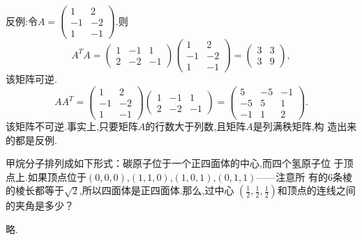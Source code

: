 ﻿\documentclass{book} \usepackage{exsheets} \usepackage{xeCJK}
\begin{document}
\begin{solution}
反例:令$A=
\begin{pmatrix}
  1&2\\
  -1&-2\\
  1&-1
\end{pmatrix}.
$则
$$
A^TA=
\begin{pmatrix}
  1&-1&1\\
  2&-2&-1
\end{pmatrix}
\begin{pmatrix}
  1&2\\
-1&-2\\
1&-1
\end{pmatrix}=
\begin{pmatrix}
  3&3\\
  3&9
\end{pmatrix},
$$
该矩阵可逆.
$$
AA^T=
\begin{pmatrix}
  1&2\\
  -1&-2\\
  1&-1
\end{pmatrix}
\begin{pmatrix}
  1&-1&1\\
  2&-2&-1
\end{pmatrix}=
\begin{pmatrix}
  5&-5&-1\\
  -5&5&1\\
  -1&1&2
\end{pmatrix}.
$$
该矩阵不可逆.事实上,只要矩阵$A$的行数大于列数,且矩阵$A$是列满秩矩阵,构
造出来的都是反例.
\end{solution}
\begin{question}
  甲烷分子排列成如下形式：碳原子位于一个正四面体的中心,而四个氢原子位
  于顶点上.如果顶点位于$(0,0,0)$,$(1,1,0)$,$(1,0,1)$,$(0,1,1)$——注意所
  有的$6$条棱的棱长都等于$\sqrt{2}$,所以四面体是正四面体.那么,过中心
  $(\frac{1}{2},\frac{1}{2},\frac{1}{2})$和顶点的连线之间的夹角是多少？
\end{question}
\begin{solution}
  略.
\end{solution}
\end{document}
